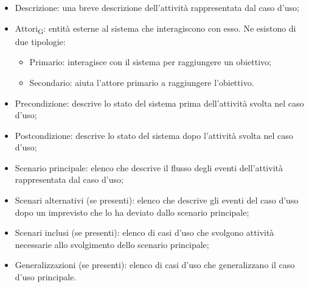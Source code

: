 	\begin{itemize}
		\item Descrizione: una breve descrizione dell'attività rappresentata dal caso d'uso;
		\item Attori\textsubscript{G}: entità esterne al sistema che interagiscono con esso. Ne esistono di due tipologie:
		\begin{itemize}
			\item Primario: interagisce con il sistema per raggiungere un obiettivo;
			\item Secondario: aiuta l'attore primario a raggiungere l'obiettivo.
		\end{itemize}
		\item Precondizione: descrive lo stato del sistema prima dell'attività svolta nel caso d'uso;
		\item Postcondizione: descrive lo stato del sistema dopo l'attività svolta nel caso d'uso;
		\item Scenario principale: elenco che descrive il flusso degli eventi dell'attività rappresentata dal caso d'uso;
		\item Scenari alternativi (se presenti): elenco che descrive gli eventi del caso d'uso dopo un imprevisto che lo ha deviato dallo scenario principale;
		\item Scenari inclusi (se presenti): elenco di casi d'uso che svolgono attività necessarie allo svolgimento dello scenario principale;
		\item Generalizzazioni (se presenti): elenco di casi d'uso che generalizzano il caso d'uso principale.
	\end{itemize}
    
